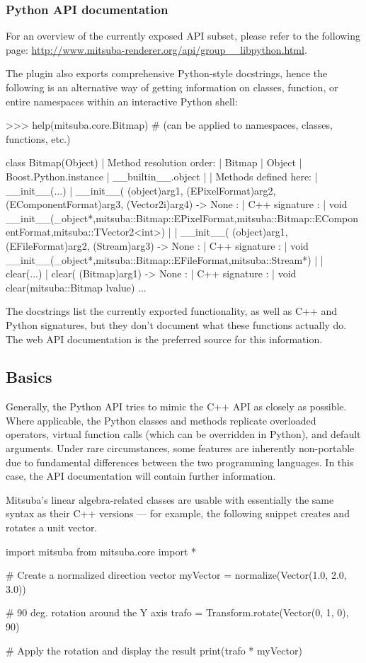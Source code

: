 \subsubsection*{Python API documentation}
For an overview of the currently exposed API subset, please refer
to the following page: \url{http://www.mitsuba-renderer.org/api/group__libpython.html}.

The plugin also exports comprehensive Python-style docstrings, hence
the following is an alternative way of getting information on
classes, function, or entire namespaces within an interactive Python shell:
\begin{shell}
>>> help(mitsuba.core.Bitmap) # (can be applied to namespaces, classes, functions, etc.)

 class Bitmap(Object)
  |  Method resolution order:
  |      Bitmap
  |      Object
  |      Boost.Python.instance
  |      __builtin__.object
  |
  |  Methods defined here:
  |  __init__(...)
  |      __init__( (object)arg1, (EPixelFormat)arg2, (EComponentFormat)arg3, (Vector2i)arg4) -> None :
  |          C++ signature :
  |              void __init__(_object*,mitsuba::Bitmap::EPixelFormat,mitsuba::Bitmap::EComponentFormat,mitsuba::TVector2<int>)
  |
  |      __init__( (object)arg1, (EFileFormat)arg2, (Stream)arg3) -> None :
  |          C++ signature :
  |              void __init__(_object*,mitsuba::Bitmap::EFileFormat,mitsuba::Stream*)
  |
  |  clear(...)
  |      clear( (Bitmap)arg1) -> None :
  |          C++ signature :
  |              void clear(mitsuba::Bitmap {lvalue})
...
\end{shell}
The docstrings list the currently exported functionality, as well as C++ and Python signatures, but they
don't document what these functions actually do. The web API documentation is
the preferred source for this information.

\subsection{Basics}
Generally, the Python API tries to mimic the C++ API as closely as possible.
Where applicable, the Python classes and methods replicate overloaded operators,
virtual function calls (which can be overridden in Python), and default arguments. Under rare circumstances,
some features are inherently non-portable due to fundamental differences between the
two programming languages. In this case, the API documentation will contain further
information.

Mitsuba's linear algebra-related classes are usable with essentially the
same syntax as their C++ versions --- for example, the following snippet
creates and rotates a unit vector.
\begin{python}
import mitsuba
from mitsuba.core import *

# Create a normalized direction vector
myVector = normalize(Vector(1.0, 2.0, 3.0))

# 90 deg. rotation around the Y axis
trafo = Transform.rotate(Vector(0, 1, 0), 90)

# Apply the rotation and display the result
print(trafo * myVector)
\end{python}

